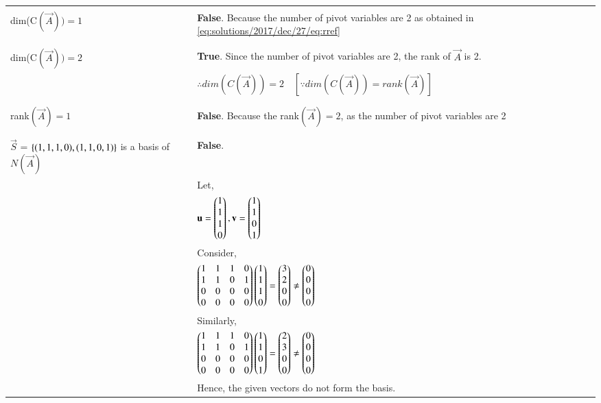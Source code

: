 \begin{table*}[!ht]
	\begin{tabular}{|m{4.5cm}|l|}
		\hline
		&\\
		dim(C$(\vec{A})) = 1$ 
		& \textbf{False}. Because the number of pivot variables are 2 as obtained in \eqref{eq:solutions/2017/dec/27/eq:rref}\\
		&\\
		\hline
		&\\
		dim(C$(\vec{A})) = 2$
		& \textbf{True}. Since the number of pivot variables are 2, the rank of $\vec{A}$ is 2.\\
		&$\therefore dim(C(\vec{A})) = 2 \quad [\because dim(C(\vec{A})) = rank(\vec{A})]$ \\
		&\\
		\hline
		&\\
	     rank$(\vec{A}) = 1$
		& \textbf{False}. Because the rank$(\vec{A}) = 2$, as the number of pivot variables are 2\\
		&\\
		\hline
		&\\
		$\vec{S}$ = $\left\{(1, 1, 1, 0), (1, 1, 0, 1)\right\}$ is a basis of $N(\vec{A})$
		& \textbf{False}. \\
		& Let, \\
		&  $\mathbf{u} = \begin{pmatrix}1\\1\\1\\0\end{pmatrix}, \mathbf{v} = \begin{pmatrix}1\\1\\0\\1\end{pmatrix}$\\ 
		&Consider, \\
		&$\begin{pmatrix}1 & 1 & 1 & 0 \\ 1 & 1 & 0 & 1\\ 0 & 0 & 0 & 0\\0 & 0 & 0 & 0\end{pmatrix}\begin{pmatrix}1\\1\\1\\0\end{pmatrix} = \begin{pmatrix}3\\2\\0\\0\end{pmatrix} \not = \begin{pmatrix}0\\0\\0\\0\end{pmatrix}$\\
		& Similarly,\\
		&$\begin{pmatrix}1 & 1 & 1 & 0 \\ 1 & 1 & 0 & 1\\ 0 & 0 & 0 & 0\\0 & 0 & 0 & 0\end{pmatrix}\begin{pmatrix}1\\1\\0\\1\end{pmatrix} = \begin{pmatrix}2\\3\\0\\0\end{pmatrix} \not = \begin{pmatrix}0\\0\\0\\0\end{pmatrix}$ \\
		&Hence, the given vectors do not form the basis.\\
		\hline
	\end{tabular}
\caption{}
\label{eq:solutions/2017/dec/27/tab}
\end{table*}
